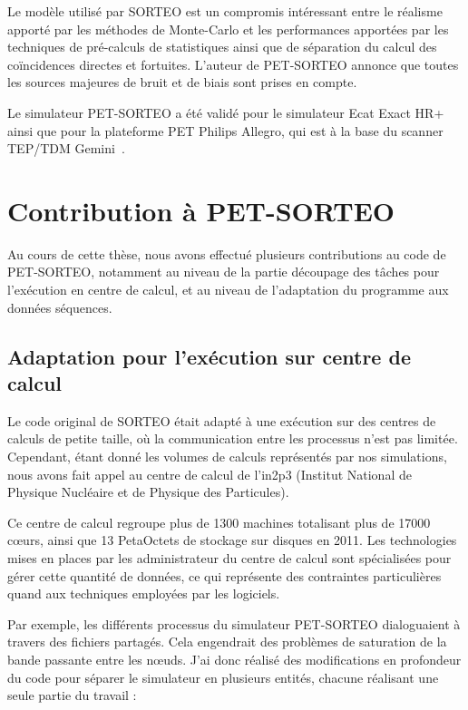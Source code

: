 Le modèle utilisé par SORTEO est un compromis intéressant entre le réalisme apporté par les méthodes de Monte-Carlo et les performances apportées par les techniques de pré-calculs de statistiques ainsi que de séparation du calcul des coïncidences directes et fortuites. L'auteur de PET-SORTEO annonce que toutes les sources majeures de bruit et de biais sont prises en compte.

Le simulateur PET-SORTEO a été validé pour le simulateur Ecat Exact HR+~\cite{reilhac2004pet} ainsi que pour la plateforme PET Philips Allegro, qui est à la base du scanner TEP/TDM Gemini~\cite{lemaitre2008}. 


	\section{Contribution à PET-SORTEO}

Au cours de cette thèse, nous avons effectué plusieurs contributions au code de PET-SORTEO, notamment au niveau de la partie découpage des tâches pour l'exécution en centre de calcul, et au niveau de l'adaptation du programme aux données séquences.

\subsection{Adaptation pour l'exécution sur centre de calcul}

Le code original de SORTEO était adapté à une exécution sur des centres de calculs de petite taille, où la communication entre les processus n’est pas limitée. Cependant, étant donné les volumes de calculs représentés par nos simulations, nous avons fait appel au centre de calcul de l'in2p3 (Institut National de Physique Nucléaire et de Physique des Particules).

Ce centre de calcul regroupe plus de 1300 machines totalisant plus de 17000 cœurs, ainsi que 13 PetaOctets de stockage sur disques en 2011. Les technologies mises en places par les administrateur du centre de calcul sont spécialisées pour gérer cette quantité de données, ce qui représente des contraintes particulières quand aux techniques employées par les logiciels.

Par exemple, les différents processus du simulateur PET-SORTEO dialoguaient à travers des fichiers partagés. Cela engendrait des problèmes de saturation de la bande passante entre les nœuds. J'ai donc réalisé des modifications en profondeur du code pour séparer le simulateur en plusieurs entités, chacune réalisant une seule partie du travail :


